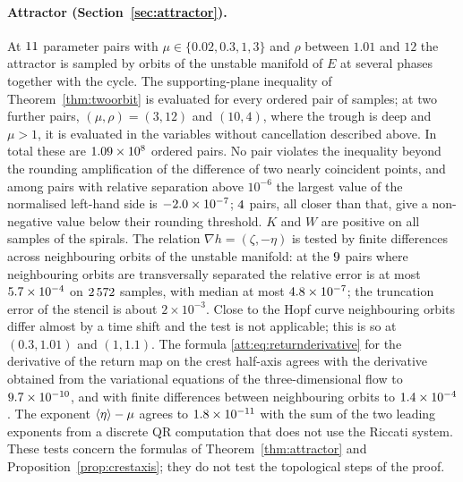 \paragraph{Attractor (Section~\ref{sec:attractor}).}
At $11$ parameter pairs with $\mu\in\{0.02,0.3,1,3\}$ and $\rho$ between $1.01$ and $12$ the attractor is sampled by orbits of the unstable manifold of $E$ at several phases together with the cycle. The supporting-plane inequality of Theorem~\ref{thm:twoorbit} is evaluated for every ordered pair of samples; at two further pairs, $(\mu,\rho)=(3,12)$ and $(10,4)$, where the trough is deep and $\mu>1$, it is evaluated in the variables without cancellation described above. In total these are $1.09\times10^{8}$ ordered pairs. No pair violates the inequality beyond the rounding amplification of the difference of two nearly coincident points, and among pairs with relative separation above $10^{-6}$ the largest value of the normalised left-hand side is $-2.0\times10^{-7}$; $4$ pairs, all closer than that, give a non-negative value below their rounding threshold. $K$ and $W$ are positive on all samples of the spirals. The relation $\nabla h=(\zeta,-\eta)$ is tested by finite differences across neighbouring orbits of the unstable manifold: at the $9$ pairs where neighbouring orbits are transversally separated the relative error is at most $5.7\times10^{-4}$ on $2\,572$ samples, with median at most $4.8\times10^{-7}$; the truncation error of the stencil is about $2\times10^{-3}$. Close to the Hopf curve neighbouring orbits differ almost by a time shift and the test is not applicable; this is so at $(0.3,1.01)$ and $(1,1.1)$. The formula \eqref{att:eq:returnderivative} for the derivative of the return map on the crest half-axis agrees with the derivative obtained from the variational equations of the three-dimensional flow to $9.7\times10^{-10}$, and with finite differences between neighbouring orbits to $1.4\times10^{-4}$. The exponent $\left\langle \eta\right\rangle-\mu$ agrees to $1.8\times10^{-11}$ with the sum of the two leading exponents from a discrete QR computation that does not use the Riccati system. These tests concern the formulas of Theorem~\ref{thm:attractor} and Proposition~\ref{prop:crestaxis}; they do not test the topological steps of the proof.

